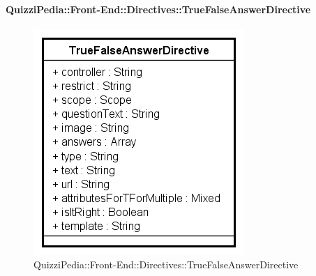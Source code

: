 		\paragraph{QuizziPedia::Front-End::Directives::TrueFalseAnswerDirective}
		
		\label{QuizziPedia::Front-End::Directives::TrueFalseAnswerDirective}
		
		\begin{figure}[ht]
			\centering
			\includegraphics[scale=0.80,keepaspectratio]{UML/Classi/Front-End/QuizziPedia_Front-end_Templates_TrueFalseAnswerTemplate.png}
			\caption{QuizziPedia::Front-End::Directives::TrueFalseAnswerDirective}
		\end{figure} \FloatBarrier
		
